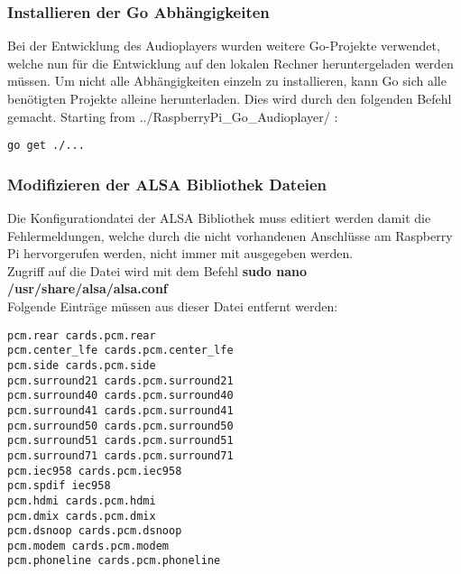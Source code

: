 \subsubsection{Installieren der Go Abhängigkeiten}
Bei der Entwicklung des Audioplayers wurden weitere Go-Projekte verwendet, welche nun für die Entwicklung auf den lokalen Rechner heruntergeladen werden müssen. Um nicht alle Abhängigkeiten einzeln zu installieren, kann Go sich alle benötigten Projekte alleine herunterladen. Dies wird durch den folgenden Befehl gemacht.
Starting from ../RaspberryPi\_Go\_Audioplayer/ :
\begin{lstlisting}
go get ./...  
\end{lstlisting}

\subsubsection{Modifizieren der ALSA Bibliothek Dateien}
Die Konfigurationdatei der ALSA Bibliothek muss editiert werden damit die Fehlermeldungen, welche durch die nicht vorhandenen Anschlüsse am Raspberry Pi hervorgerufen werden, nicht immer mit ausgegeben werden. \\
Zugriff auf die Datei wird mit dem Befehl \textbf{sudo nano /usr/share/alsa/alsa.conf}  \\
Folgende Einträge müssen aus dieser Datei entfernt werden:
\begin{lstlisting}[caption={Liste der zu löschenden Einträge}]
pcm.rear cards.pcm.rear 
pcm.center_lfe cards.pcm.center_lfe 
pcm.side cards.pcm.side 
pcm.surround21 cards.pcm.surround21 
pcm.surround40 cards.pcm.surround40 
pcm.surround41 cards.pcm.surround41 
pcm.surround50 cards.pcm.surround50 
pcm.surround51 cards.pcm.surround51 
pcm.surround71 cards.pcm.surround71 
pcm.iec958 cards.pcm.iec958 
pcm.spdif iec958 
pcm.hdmi cards.pcm.hdmi 
pcm.dmix cards.pcm.dmix 
pcm.dsnoop cards.pcm.dsnoop 
pcm.modem cards.pcm.modem 
pcm.phoneline cards.pcm.phoneline
\end{lstlisting}

